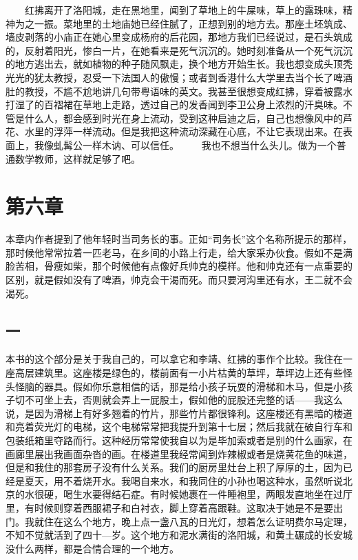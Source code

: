  　　红拂离开了洛阳城，走在黑地里，闻到了草地上的牛屎味，草上的露珠味，精 神为之一振。菜地里的土地庙她已经住腻了，正想到别的地方去。那座土坯筑成、 墙皮剥落的小庙正在她心里变成杨府的后花园，那地方我们已经说过，是石头筑成 的，反射着阳光，惨白一片，在她看来是死气沉沉的。她时刻准备从一个死气沉沉 的地方逃出去，就如植物的种子随风飘走，换个地方开始生长。我也想变成头顶秃 光光的犹太教授，忍受一下法国人的傲慢；或者到香港什么大学里去当个长了啤酒 肚的教授，不尴不尬地讲几句带粤语味的英文。我甚至很想变成红拂，穿着被露水 打湿了的百褶裙在草地上走路，透过自己的发香闻到李卫公身上浓烈的汗臭味。不 管是什么人，都会感到时光在身上流动，受到这种启迪之后，自己也想像风中的芦 花、水里的浮萍一样流动。但是我把这种流动深藏在心底，不让它表现出来。在表 面上，我像虬髯公一样木讷、可以信任。 　　我也不想当什么头儿。做为一个普通数学教师，这样就足够了吧。 
 
\section{第六章} 

本章内作者提到了他年轻时当司务长的事。正如“司务长”这个名称所提示的那样，那时候他常常拉着一匹老马，在乡间的小路上行走，给大家采办伙食。假如不是满脸苦相，骨瘦如柴，那个时候他有点像好兵帅克的模样。他和帅克还有一点重要的区别，就是假如没有了啤酒，帅克会干渴而死。而只要河沟里还有水，王二就不会渴死。 

\subsection{一} 

本书的这个部分是关于我自己的，可以拿它和李靖、红拂的事作个比较。我住在一座高层建筑里。这座楼是绿色的，楼前面有一小片枯黄的草坪，草坪边上还有些怪头怪脑的器具。假如你乐意相信的话，那是给小孩子玩耍的滑梯和木马，但是小孩子切不可坐上去，否则就会弄上一屁股土，假如他的屁股还完整的话——我这么说，是因为滑梯上有好多翘着的竹片，那些竹片都很锋利。这座楼还有黑暗的楼道和亮着荧光灯的电梯，这个电梯常常把我提升到第十七层；然后我就在破自行车和包装纸箱里夺路而行。这种经历常常使我自以为是毕加索或者是别的什么画家，在画廊里展出我画面杂沓的画。在楼道里我经常闻到炸辣椒或者是烧黄花鱼的味道，但是和我住的那套房子没有什么关系。我们的厨房里灶台上积了厚厚的土，因为已经是夏天，用不着烧开水。我喝自来水，和我同住的小孙也喝这种水，虽然听说北京的水很硬，喝生水要得结石症。有时候她裹在一件睡袍里，两眼发直地坐在过厅里，有时候则穿着西服裙子和白衬衣，脚上穿着高跟鞋。这取决于她是不是要出门。我就住在这么个地方，晚上点一盏八瓦的日光灯，想着怎么证明费尔马定理，不知不觉就活到了四十—岁。这个地方和泥水满街的洛阳城，和黄土碾成的长安城没什么两样，都是合情合理的一个地方。 

